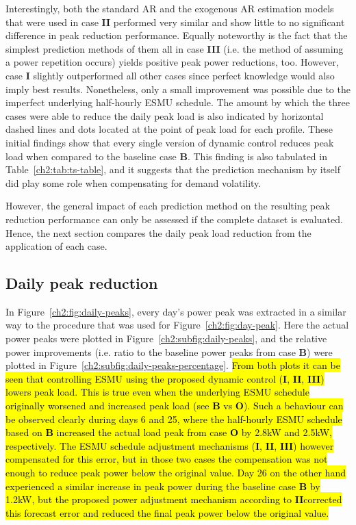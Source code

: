 Interestingly, both the standard AR and the exogenous AR estimation models that were used in case \textbf{II} performed very similar and show little to no significant difference in peak reduction performance.
Equally noteworthy is the fact that the simplest prediction methods of them all in case \textbf{III} (i.e. the method of assuming a power repetition occurs) yields positive peak power reductions, too.
However, case \textbf{I} slightly outperformed all other cases since perfect knowledge would also imply best results.
Nonetheless, only a small improvement was possible due to the imperfect underlying half-hourly ESMU schedule.
The amount by which the three cases were able to reduce the daily peak load is also indicated by horizontal dashed lines and dots located at the point of peak load for each profile.
These initial findings show that every single version of dynamic control reduces peak load when compared to the baseline case \textbf{B}.
This finding is also tabulated in Table~\ref{ch2:tab:ts-table}, and it suggests that the prediction mechanism by itself did play some role when compensating for demand volatility.



However, the general impact of each prediction method on the resulting peak reduction performance can only be assessed if the complete dataset is evaluated.
Hence, the next section compares the daily peak load reduction from the application of each case.

\subsection{Daily peak reduction}



In Figure~\ref{ch2:fig:daily-peaks}, every day's power peak was extracted in a similar way to the procedure that was used for Figure~\ref{ch2:fig:day-peak}.
Here the actual power peaks were plotted in Figure~\ref{ch2:subfig:daily-peaks}, and the relative power improvements (i.e. ratio to the baseline power peaks from case \textbf{B}) were plotted in Figure~\ref{ch2:subfig:daily-peaks-percentage}.
\hl{From both plots it can be seen that controlling ESMU using the proposed dynamic control (\textbf{I}, \textbf{II}, \textbf{III}) lowers peak load.
This is true even when the underlying ESMU schedule originally worsened and increased peak load (see \textbf{B} vs \textbf{O}).
Such a behaviour can be observed clearly during days 6 and 25, where the half-hourly ESMU schedule based on \textbf{B} increased the actual load peak from case \textbf{O} by 2.8kW and 2.5kW, respectively.
The ESMU schedule adjustment mechanisms (\textbf{I}, \textbf{II}, \textbf{III}) however compensated for this error, but in those two cases the compensation was not enough to reduce peak power below the original value.
Day 26 on the other hand experienced a similar increase in peak power during the baseline case \textbf{B} by 1.2kW, but the proposed power adjustment mechanism according to \textbf{II}corrected this forecast error and reduced the final peak power below the original value.}

